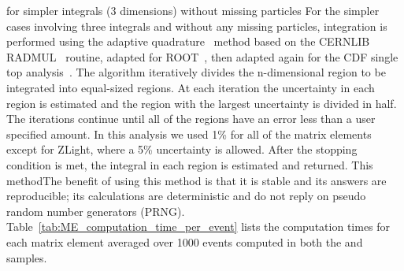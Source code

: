 for simpler integrals (3 dimensions) without missing particles
For the simpler cases involving three integrals and without any missing particles, integration is performed using the adaptive quadrature~\cite{VANDOOREN1976207} method based on the CERNLIB~\cite{CERNLIB} RADMUL~\cite{GENZ1980295} routine, adapted for ROOT~\cite{Brun:1997pa}, then adapted again for the CDF single top analysis~\cite{Dong2008}.
The algorithm iteratively divides the n-dimensional region to be integrated into equal-sized regions.
At each iteration the uncertainty in each region is estimated and the region with the largest uncertainty is divided in half.
The iterations continue until all of the regions have an error less than a user specified amount.
In this analysis we used 1\% for all of the matrix elements except for ZLight, where a 5\% uncertainty is allowed.
After the stopping condition is met, the integral in each region is estimated and returned.
This methodThe benefit of using this method is that it is stable and its answers are reproducible; its calculations are deterministic and do not reply on pseudo random number generators (PRNG).
Table~\ref{tab:ME_computation_time_per_event} lists the computation times for each matrix element averaged over 1000 events computed in both the \Wjets and \ggH samples.

